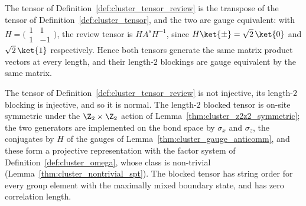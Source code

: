 \begin{lemma}\label{lem:cluster_review_gauge}
    \leanok
    The tensor of Definition~\ref{def:cluster_tensor_review} is the transpose
    of the tensor of Definition~\ref{def:cluster_tensor}, and the two are
    gauge equivalent: with
    $H = \bigl(\begin{smallmatrix} 1 & 1 \\ 1 & -1 \end{smallmatrix}\bigr)$,
    the review tensor is $H A^s H^{-1}$, since $H\ket{\pm} = \sqrt{2}\,\ket{0}$
    and $\sqrt{2}\,\ket{1}$ respectively. Hence both tensors generate the same
    matrix product vectors at every length, and their length-$2$ blockings are
    gauge equivalent by the same matrix.
\end{lemma}

\begin{lemma}\label{thm:cluster_review_transferred}
    \leanok
    The tensor of Definition~\ref{def:cluster_tensor_review} is not injective,
    its length-$2$ blocking is injective, and so it is normal. The length-$2$
    blocked tensor is on-site symmetric under the $\Z_2 \times \Z_2$ action of
    Lemma~\ref{thm:cluster_z2z2_symmetric}; the two generators are
    implemented on the bond space by $\sigma_x$ and $\sigma_z$, the
    conjugates by $H$ of the gauges of
    Lemma~\ref{thm:cluster_gauge_anticomm}, and these form a projective
    representation with the factor system of
    Definition~\ref{def:cluster_omega}, whose class is non-trivial
    (Lemma~\ref{thm:cluster_nontrivial_spt}). The blocked tensor has string
    order for every group element with the maximally mixed boundary state, and
    has zero correlation length.
\end{lemma}

